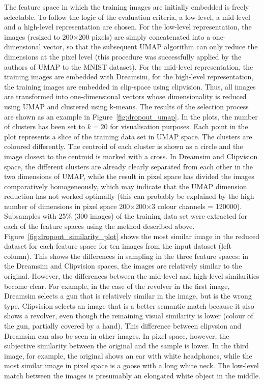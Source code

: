 The feature space in which the training images are initially embedded is freely selectable. To follow the logic of the evaluation criteria, a low-level, a mid-level and a high-level representation are chosen. For the low-level representation, the images (resized to 200$\times$200 pixels) are simply concatenated into a one-dimensional vector, so that the subsequent UMAP algorithm can only reduce the dimensions at the pixel level (this procedure was successfully applied by the authors of UMAP to the MNIST dataset). For the mid-level representation, the training images are embedded with Dreamsim\cite{fuDreamSimLearningNew2023}, for the high-level representation, the training images are embedded in clip-space using clipvision\cite{radfordLearningTransferableVisual2021}. Thus, all images are transformed into one-dimensional vectors whose dimensionality is reduced using UMAP and clustered using k-means. 
The results of the selection process are shown as an example in Figure~\ref{fig:dropout_umap}. In the plots, the number of clusters has been set to $k=20$ for visualisation purposes. Each point in the plot represents a slice of the training data set in UMAP space. The clusters are coloured differently. The centroid of each cluster is shown as a circle and the image closest to the centroid is marked with a cross. In Dreamsim and Clipvision space, the different clusters are already clearly separated from each other in the two dimensions of UMAP, while the result in pixel space has divided the images comparatively homogeneously, which may indicate that the UMAP dimension reduction has not worked optimally (this can probably be explained by the high number of dimensions in pixel space 200$\times$200$\times$3 colour channels = 120000). 
Subsamples with 25\% (300 images) of the training data set were extracted for each of the feature spaces using the method described above. Figure~\ref{fig:dropout_similarity_plot} shows the most similar image in the reduced dataset for each feature space for ten images from the input dataset (left column). This shows the differences in sampling in the three feature spaces: in the Dreamsim and Clipvision spaces, the images are relatively similar to the original. However, the differences between the mid-level and high-level similarities become clear. For example, in the case of the revolver in the first image, Dreamsim selects a gun that is relatively similar in the image, but is the wrong type. Clipvision selects an image that is a better semantic match because it also shows a revolver, even though the remaining visual similarity is lower (colour of the gun, partially covered by a hand). This difference between clipvsion and Dreamsim can also be seen in other images. In pixel space, however, the subjective similarity between the original and the sample is lower. In the third image, for example, the original shows an ear with white headphones, while the most similar image in pixel space is a goose with a long white neck. The low-level match between the images is presumably an elongated white object in the middle. 

